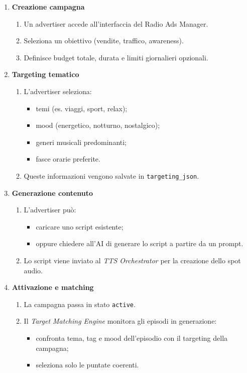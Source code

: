 \documentclass[11pt,a4paper]{article}
\begin{document}
\begin{enumerate}
    \item \textbf{Creazione campagna}
    \begin{enumerate}
        \item Un advertiser accede all'interfaccia del Radio Ads Manager.
        \item Seleziona un obiettivo (vendite, traffico, awareness).
        \item Definisce budget totale, durata e limiti giornalieri opzionali.
    \end{enumerate}

    \item \textbf{Targeting tematico}
    \begin{enumerate}
        \item L’advertiser seleziona:
        \begin{itemize}
            \item temi (es. viaggi, sport, relax);
            \item mood (energetico, notturno, nostalgico);
            \item generi musicali predominanti;
            \item fasce orarie preferite.
        \end{itemize}
        \item Queste informazioni vengono salvate in \texttt{targeting\_json}.
    \end{enumerate}

    \item \textbf{Generazione contenuto}
    \begin{enumerate}
        \item L’advertiser può:
        \begin{itemize}
            \item caricare uno script esistente;
            \item oppure chiedere all'AI di generare lo script a partire da un prompt.
        \end{itemize}
        \item Lo script viene inviato al \textit{TTS Orchestrator} per la creazione dello spot audio.
    \end{enumerate}

    \item \textbf{Attivazione e matching}
    \begin{enumerate}
        \item La campagna passa in stato \texttt{active}.
        \item Il \textit{Target Matching Engine} monitora gli episodi in generazione:
        \begin{itemize}
            \item confronta tema, tag e mood dell'episodio con il targeting della campagna;
            \item seleziona solo le puntate coerenti.
        \end{itemize}
    \end{enumerate}


\end{enumerate}
\end{document}
